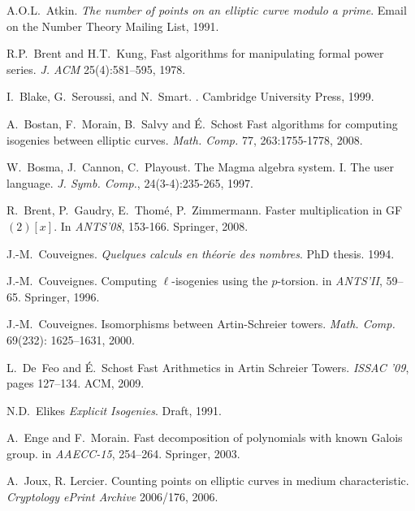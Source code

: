 
\begin{thebibliography}{AAAA00}

  A.O.L.~Atkin.
  \newblock \emph{The number of points on an elliptic curve modulo a prime}.
  \newblock Email on the Number Theory Mailing List, 1991.

R.P.~Brent and H.T.~Kung, Fast algorithms for
  manipulating formal power series.  \emph{J. ACM} 25(4):581--595, 1978.

  I.~Blake, G.~Seroussi, and N.~Smart.
  .
  \newblock Cambridge University Press, 1999.

  A.~Bostan, F.~Morain, B.~Salvy and É.~Schost
  \newblock Fast algorithms for computing isogenies between elliptic curves.
  \newblock \emph{Math. Comp.} 77, 263:1755-1778, 2008.

  W.~Bosma, J.~Cannon, C.~Playoust.
  \newblock The Magma algebra system. I. The user language.
  \newblock \emph{J. Symb. Comp.}, 24(3-4):235-265, 1997.
  
  R.~Brent, P.~Gaudry, E.~Thom{\'e}, P.~Zimmermann.
  \newblock Faster multi\-plication in GF$(2)[x]$.
  \newblock In {\em ANTS'08}, 153-166. Springer, 2008.

  J.-M.~Couveignes.
  \newblock \emph{Quelques calculs en théorie des nombres}.
  \newblock PhD thesis. 1994.

  J.-M.~Couveignes. 
  \newblock Computing {$\ell$}-isogenies using the {$p$}-torsion.
  \newblock in {\em ANTS'II}, 59--65. Springer, 1996.

  J.-M.~Couveignes. 
  \newblock Isomorphisms between {A}rtin-{S}chreier towers. 
  \newblock \emph{Math. Comp.} 69(232): 1625--1631, 2000.
  
  L.~De~Feo and \'E.~Schost
  \newblock Fast Arithmetics in Artin Schreier Towers.
  \newblock \emph{ISSAC '09}, pages 127--134. ACM, 2009.

  N.D.~Elikes
  \newblock \emph{Explicit Isogenies}.
  Draft, 1991.

  A.~Enge and F.~Morain.
  \newblock Fast decomposition of polynomials with known Galois group.
  \newblock in {\em AAECC-15}, 254--264. Springer, 2003.

A.~Joux, R. Lercier.
  \newblock Counting points on elliptic curves in medium characteristic.
  \newblock \emph{Cryptology ePrint Archive} 2006/176, 2006.


\end{thebibliography}
